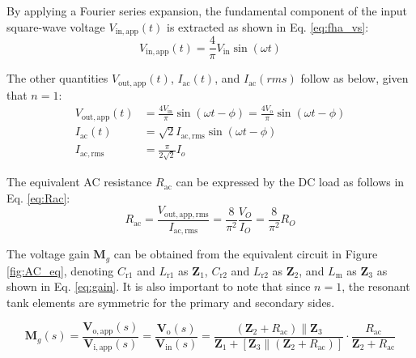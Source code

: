 By applying a Fourier series expansion, the fundamental component of the input square-wave voltage $V_{\mathrm{in, app}}(t)$ is extracted as shown in Eq. \ref{eq:fha_vs}:
\begin{equation}
V_{\mathrm{in, app}}(t) = \frac{4}{\pi}V_{\mathrm{in}}\sin(\omega t)
\label{eq:fha_vs}
\end{equation}

The other quantities $V_{\mathrm{out, app}}(t)$, $I_{\mathrm{ac}}(t)$, and $I_{\mathrm{ac}}(rms)$  follow as below, given that $n=1$:
\begin{align}
    V_{\mathrm{out,app}}(t) &= \frac{4V_{\mathrm{in}}}{\pi} \sin(\omega t - \phi) = \frac{4V_{\mathrm{o}}}{\pi}\sin(\omega t - \phi)\\
    I_{\mathrm{ac}}(t) &= \sqrt{2}I_{\mathrm{ac,rms}} \sin(\omega t - \phi) \\
    I_{\mathrm{ac,rms}} &= \frac{\pi}{2\sqrt{2}}I_o
\end{align}

The equivalent AC resistance $R_\mathrm{ac}$ can be expressed by the DC load as follows in Eq. \ref{eq:Rac}:
\begin{equation}
R_{\mathrm{ac}} = \frac{V_{\mathrm{out,app,rms}}}{I_{\mathrm{ac,rms}}} = \frac{8}{\pi^2} \frac{V_O}{I_O} = \frac{8}{\pi^2} R_O \label{eq:Rac}
\end{equation}

The voltage gain $\mathbf{M}_g$ can be obtained from the equivalent circuit in Figure \ref{fig:AC_eq}, denoting $C_{\mathrm{r1}}$ and $L_{\mathrm{r1}}$ as $\mathbf{Z}_1$, $C_{\mathrm{r2}}$ and $L_{\mathrm{r2}}$ as $\mathbf{Z}_2$, and $L_\mathrm{m}$ as $\mathbf{Z}_3$ as shown in Eq. \ref{eq:gain}. It is also important to note that since $n=1$, the resonant tank elements are symmetric for the primary and secondary sides.

\begin{equation}
\mathbf{M}_g(s) = \frac{\mathbf{V_\mathrm{o, app}}(s)}{\mathbf{V_\mathrm{i, app}}(s)} = \frac{\mathbf{V_\mathrm{o}}(s)}{\mathbf{V_\mathrm{in}}(s)} = \frac{(\mathbf{Z}_2 + R_{\mathrm{ac}}) \parallel \mathbf{Z}_3}{\mathbf{Z}_1 + [\mathbf{Z}_3 \parallel (\mathbf{Z}_2 + R_{\mathrm{ac}})]} \cdot \frac{R_{\mathrm{ac}}}{\mathbf{Z}_2 + R_{\mathrm{ac}}}\label{eq:gain}
\end{equation}

